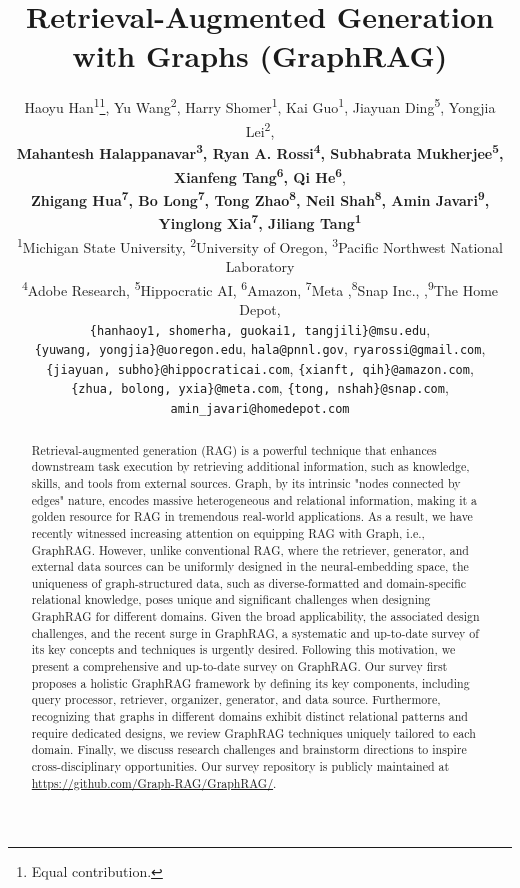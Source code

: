 \documentclass{article}
\title{Retrieval-Augmented Generation with Graphs (GraphRAG)}
\author{%
Haoyu Han\textsuperscript{1}\thanks{Equal contribution.}, Yu Wang\textsuperscript{2}\footnotemark[1], Harry Shomer\textsuperscript{1}, Kai Guo\textsuperscript{1}, Jiayuan Ding\textsuperscript{5}, Yongjia Lei\textsuperscript{2},\\
  \textbf{Mahantesh Halappanavar\textsuperscript{3}, Ryan A. Rossi\textsuperscript{4}, Subhabrata Mukherjee\textsuperscript{5}, Xianfeng Tang\textsuperscript{6}, Qi He\textsuperscript{6}}, \\ 
  \textbf{Zhigang Hua\textsuperscript{7}, Bo Long\textsuperscript{7}, 
  Tong Zhao\textsuperscript{8}, Neil Shah\textsuperscript{8}, Amin Javari\textsuperscript{9}, Yinglong Xia\textsuperscript{7}, Jiliang Tang\textsuperscript{1}} \\
  \textsuperscript{1}Michigan State University, \textsuperscript{2}University of Oregon, \textsuperscript{3}Pacific Northwest National Laboratory\\
  \textsuperscript{4}Adobe Research, \textsuperscript{5}Hippocratic AI, \textsuperscript{6}Amazon, \textsuperscript{7}Meta ,\textsuperscript{8}Snap Inc.,  ,\textsuperscript{9}The Home Depot,\\
  \texttt{\{hanhaoy1, shomerha, guokai1, tangjili\}@msu.edu}, \\
  \texttt{\{yuwang, yongjia\}@uoregon.edu}, \texttt{hala@pnnl.gov}, \texttt{ryarossi@gmail.com}, \\
    \texttt{\{jiayuan, subho\}@hippocraticai.com}, \texttt{\{xianft, qih\}@amazon.com}, \\ \texttt{\{zhua, bolong, yxia\}@meta.com},
  \texttt{\{tong, nshah\}@snap.com}, \texttt{amin\_javari@homedepot.com}
}
\begin{document}
\maketitle


\begin{abstract}
Retrieval-augmented generation (RAG) is a powerful technique that enhances downstream task execution by retrieving additional information, such as knowledge, skills, and tools from external sources. Graph, by its intrinsic "nodes connected by edges" nature, encodes massive heterogeneous and relational information, making it a golden resource for RAG in tremendous real-world applications. As a result, we have recently witnessed increasing attention on equipping RAG with Graph, i.e., GraphRAG. However, unlike conventional RAG, where the retriever, generator, and external data sources can be uniformly designed in the neural-embedding space, the uniqueness of graph-structured data, such as diverse-formatted and domain-specific relational knowledge, poses unique and significant challenges when designing GraphRAG for different domains. Given the broad applicability, the associated design challenges, and the recent surge in GraphRAG, a systematic and up-to-date survey of its key concepts and techniques is urgently desired. Following this motivation, we present a comprehensive and up-to-date survey on GraphRAG. Our survey first proposes a holistic GraphRAG framework by defining its key components, including query processor, retriever, organizer, generator, and data source. Furthermore, recognizing that graphs in different domains exhibit distinct relational patterns and require dedicated designs, we review GraphRAG techniques uniquely tailored to each domain. Finally, we discuss research challenges and brainstorm directions to inspire cross-disciplinary opportunities. Our survey repository is publicly maintained at \url{https://github.com/Graph-RAG/GraphRAG/}.
\end{abstract}



























\end{document}
